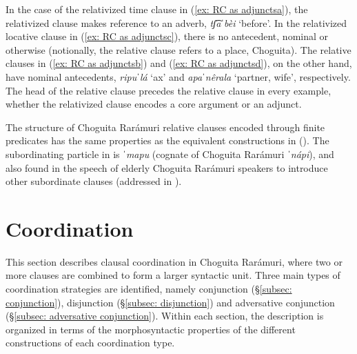                 \label{ex: RC as adjunctsd}
    \z
\z

In the case of the relativized time clause in (\ref{ex: RC as adjunctsa}), the relativized clause makes reference to an adverb, \textit{tʃ͡aˈbèi} `before'. In the relativized locative clause in (\ref{ex: RC as adjunctsc}), there is no antecedent, nominal or otherwise (notionally, the relative clause refers to a place, Choguita). The relative clauses in (\ref{ex: RC as adjunctsb}) and (\ref{ex: RC as adjunctsd}), on the other hand, have nominal antecedents, \textit{ripuˈlá} `ax' and \textit{apaˈnêrala} `partner, wife', respectively. The head of the relative clause precedes the relative clause in every example, whether the relativized clause encodes a core argument or an adjunct.

The structure of Choguita Rarámuri relative clauses encoded through finite predicates has the same properties as the equivalent constructions in  (\citealt[38]{moralesmoreno2016rochecahi}). The subordinating particle in  is \textit{ˈmapu} (cognate of Choguita Rarámuri \textit{ˈnápi}), and also found in the speech of elderly Choguita Rarámuri speakers to introduce other subordinate clauses (addressed in ).

\section{Coordination}
\label{sec: coordination}

This section describes clausal coordination in Choguita Rarámuri, where two or more clauses are combined to form a larger syntactic unit. Three main types of coordination strategies are identified, namely conjunction (§\ref{subsec: conjunction}), disjunction (§\ref{subsec: disjunction}) and adversative conjunction (§\ref{subsec: adversative conjunction}). Within each section, the description is organized in terms of the morphosyntactic properties of the different constructions of each coordination type.

